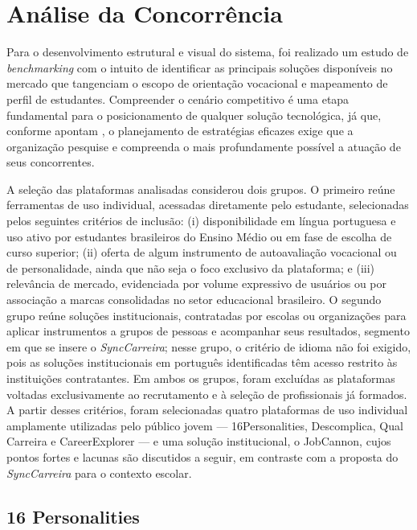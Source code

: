 \section{Análise da Concorrência}\label{sec:concorrencia}

Para o desenvolvimento estrutural e visual do sistema, foi realizado um estudo de \textit{benchmarking} com o intuito de identificar as principais soluções disponíveis no mercado que tangenciam o escopo de orientação vocacional e mapeamento de perfil de estudantes. Compreender o cenário competitivo é uma etapa fundamental para o posicionamento de qualquer solução tecnológica, já que, conforme apontam , o planejamento de estratégias eficazes exige que a organização pesquise e compreenda o mais profundamente possível a atuação de seus concorrentes.

A seleção das plataformas analisadas considerou dois grupos. O primeiro reúne ferramentas de uso individual, acessadas diretamente pelo estudante, selecionadas pelos seguintes critérios de inclusão: (i) disponibilidade em língua portuguesa e uso ativo por estudantes brasileiros do Ensino Médio ou em fase de escolha de curso superior; (ii) oferta de algum instrumento de autoavaliação vocacional ou de personalidade, ainda que não seja o foco exclusivo da plataforma; e (iii) relevância de mercado, evidenciada por volume expressivo de usuários ou por associação a marcas consolidadas no setor educacional brasileiro. O segundo grupo reúne soluções institucionais, contratadas por escolas ou organizações para aplicar instrumentos a grupos de pessoas e acompanhar seus resultados, segmento em que se insere o \textit{SyncCarreira}; nesse grupo, o critério de idioma não foi exigido, pois as soluções institucionais em português identificadas têm acesso restrito às instituições contratantes. Em ambos os grupos, foram excluídas as plataformas voltadas exclusivamente ao recrutamento e à seleção de profissionais já formados. A partir desses critérios, foram selecionadas quatro plataformas de uso individual amplamente utilizadas pelo público jovem --- 16Personalities, Descomplica, Qual Carreira e CareerExplorer --- e uma solução institucional, o JobCannon, cujos pontos fortes e lacunas são discutidos a seguir, em contraste com a proposta do \textit{SyncCarreira} para o contexto escolar.

\subsection{16 Personalities}

